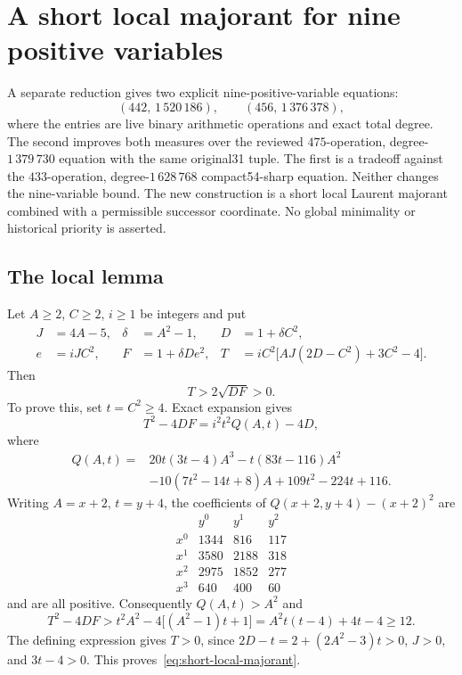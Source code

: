 \section{A short local majorant for nine positive variables}

A separate reduction gives two explicit nine-positive-variable equations:
\[
 (442,\,1\,520\,186),\qquad (456,\,1\,376\,378),
\]
where the entries are live binary arithmetic operations and exact total degree.
The second improves both measures over the reviewed
$475$-operation, degree-$1\,379\,730$ equation with the same original31 tuple.
The first is a tradeoff against the $433$-operation,
degree-$1\,628\,768$ compact54-sharp equation.  Neither changes the
nine-variable bound.  The new construction is a short local Laurent
majorant combined with a permissible successor coordinate.  No global
minimality or historical priority is asserted.

\subsection{The local lemma}

Let $A\ge2$, $C\ge2$, $i\ge1$ be integers and put
\begin{align*}
 J&=4A-5,& \delta&=A^2-1,&D&=1+\delta C^2,\\
 e&=iJC^2,&F&=1+\delta De^2,&
 T&=iC^2\bigl[AJ(2D-C^2)+3C^2-4\bigr].
\end{align*}
Then
\begin{equation}\label{eq:short-local-majorant}
                  T>2\sqrt{DF}>0.
\end{equation}
To prove this, set $t=C^2\ge4$. Exact expansion gives
\[
 T^2-4DF=i^2t^2Q(A,t)-4D,
\]
where
\begin{align*}
 Q(A,t)={}&20t(3t-4)A^3-t(83t-116)A^2\\
          &-10(7t^2-14t+8)A+109t^2-224t+116.
\end{align*}
Writing $A=x+2$, $t=y+4$, the coefficients of
$Q(x+2,y+4)-(x+2)^2$ are
\[
\begin{array}{c|rrr}
 &y^0&y^1&y^2\\ \hline
 x^0&1344&816&117\\
 x^1&3580&2188&318\\
 x^2&2975&1852&277\\
 x^3&640&400&60
\end{array}
\]
and are all positive. Consequently $Q(A,t)>A^2$ and
\[
 T^2-4DF>t^2A^2-4\bigl[(A^2-1)t+1\bigr]
       =A^2t(t-4)+4t-4\ge12.
\]
The defining expression gives $T>0$, since
$2D-t=2+(2A^2-3)t>0$, $J>0$, and $3t-4>0$.
This proves~\eqref{eq:short-local-majorant}.

